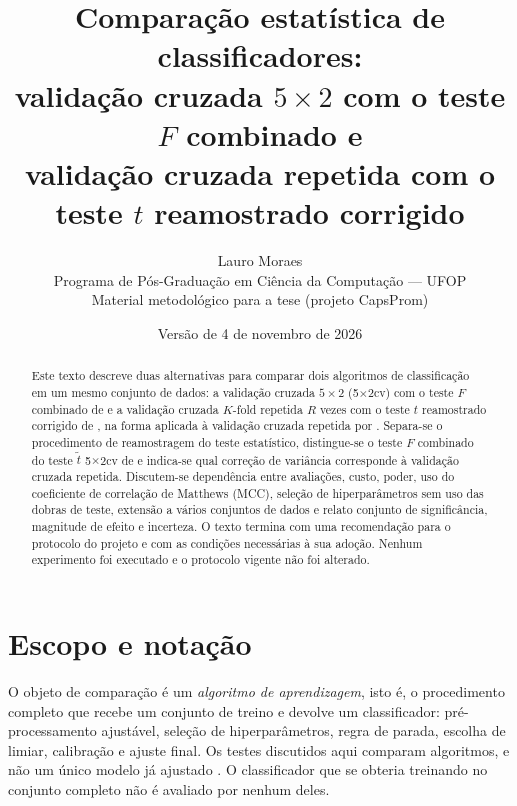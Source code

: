 \documentclass[11pt,a4paper]{article}
\title{Comparação estatística de classificadores:\\
validação cruzada $5\times2$ com o teste $F$ combinado e\\
validação cruzada repetida com o teste $t$ reamostrado corrigido}
\author{Lauro Moraes\\[2pt]
\small Programa de Pós-Graduação em Ciência da Computação --- UFOP\\
\small Material metodológico para a tese (projeto CapsProm)}
\date{Versão de 4 de novembro de 2026}
\begin{document}
\maketitle

\begin{abstract}
Este texto descreve duas alternativas para comparar dois algoritmos de
classificação em um mesmo conjunto de dados: a validação cruzada $5\times2$
(5$\times$2cv) com o teste $F$ combinado de \citet{alpaydin1999combined} e a
validação cruzada $K$-fold repetida $R$ vezes com o teste $t$ reamostrado
corrigido de \citet{nadeau2003inference}, na forma aplicada à validação cruzada
repetida por \citet{bouckaert2004replicability}. Separa-se o procedimento de
reamostragem do teste estatístico, distingue-se o teste $F$ combinado do teste
$\tilde t$ 5$\times$2cv de \citet{dietterich1998approximate} e indica-se qual
correção de variância corresponde à validação cruzada repetida. Discutem-se
dependência entre avaliações, custo, poder, uso do coeficiente de correlação de
Matthews (MCC), seleção de hiperparâmetros sem uso das dobras de teste,
extensão a vários conjuntos de dados e relato conjunto de significância,
magnitude de efeito e incerteza. O texto termina com uma recomendação para o
protocolo do projeto e com as condições necessárias à sua adoção. Nenhum
experimento foi executado e o protocolo vigente não foi alterado.
\end{abstract}

\tableofcontents

\section{Escopo e notação}\label{sec:notacao}

O objeto de comparação é um \emph{algoritmo de aprendizagem}, isto é, o
procedimento completo que recebe um conjunto de treino e devolve um
classificador: pré-processamento ajustável, seleção de hiperparâmetros, regra
de parada, escolha de limiar, calibração e ajuste final. Os testes discutidos
aqui comparam algoritmos, e não um único modelo já ajustado
\citep{dietterich1998approximate}. O classificador que se obteria treinando no
conjunto completo não é avaliado por nenhum deles.
\end{document}

